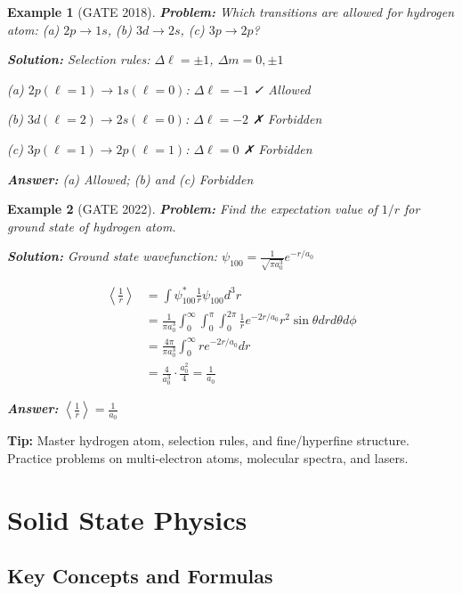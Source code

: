 \documentclass[12pt,a4paper]{article}
\newtheorem{example}{Example}[section]
\newcommand{\ans}[1]{\textcolor{red!70!black}{\textbf{Answer:} #1}}
\newcommand{\sol}{\textcolor{blue!70!black}{\textbf{Solution:}}}
\newcommand{\tip}[1]{\textcolor{green!60!black}{\textbf{Tip:} #1}}
\begin{document}
\begin{example}[GATE 2018]
\textbf{Problem:} Which transitions are allowed for hydrogen atom: (a) $2p \to 1s$, (b) $3d \to 2s$, (c) $3p \to 2p$?

\sol
Selection rules: $\Delta \ell = \pm 1$, $\Delta m = 0, \pm 1$

(a) $2p (\ell=1) \to 1s (\ell=0)$: $\Delta \ell = -1$ ✓ Allowed

(b) $3d (\ell=2) \to 2s (\ell=0)$: $\Delta \ell = -2$ ✗ Forbidden

(c) $3p (\ell=1) \to 2p (\ell=1)$: $\Delta \ell = 0$ ✗ Forbidden

\ans{(a) Allowed; (b) and (c) Forbidden}
\end{example}

\begin{example}[GATE 2022]
\textbf{Problem:} Find the expectation value of $1/r$ for ground state of hydrogen atom.

\sol
Ground state wavefunction: $\psi_{100} = \frac{1}{\sqrt{\pi a_0^3}} e^{-r/a_0}$

\begin{align}
\left\langle \frac{1}{r} \right\rangle &= \int \psi_{100}^* \frac{1}{r} \psi_{100} d^3r\\
&= \frac{1}{\pi a_0^3} \int_0^{\infty} \int_0^{\pi} \int_0^{2\pi} \frac{1}{r} e^{-2r/a_0} r^2 \sin\theta dr d\theta d\phi\\
&= \frac{4\pi}{\pi a_0^3} \int_0^{\infty} r e^{-2r/a_0} dr\\
&= \frac{4}{a_0^3} \cdot \frac{a_0^2}{4} = \frac{1}{a_0}
\end{align}

\ans{$\left\langle \frac{1}{r} \right\rangle = \frac{1}{a_0}$}
\end{example}

\tip{Master hydrogen atom, selection rules, and fine/hyperfine structure. Practice problems on multi-electron atoms, molecular spectra, and lasers.}

\section{Solid State Physics}

\subsection{Key Concepts and Formulas}
\end{document}
